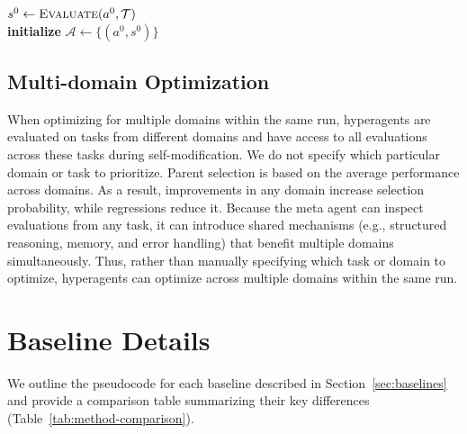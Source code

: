 \begin{algorithm}[H]
\DontPrintSemicolon
\SetAlgoLined
{}
\BlankLine
$s^{0} \leftarrow \textsc{Evaluate}(a^{0}, \mathcal{T})$ \\
\textbf{initialize} $\mathcal{A} \leftarrow \{(a^{0}, s^{0})\}$ 
\caption{Darwin G\"odel Machine with Hyperagents (DGM-H)}
\label{algo:DGM-H}
\end{algorithm}

\subsection{Multi-domain Optimization}
\label{app:multi-domain}

When optimizing for multiple domains within the same run, hyperagents are evaluated on tasks from different domains and have access to all evaluations across these tasks during self-modification. We do not specify which particular domain or task to prioritize. Parent selection is based on the average performance across domains. As a result, improvements in any domain increase selection probability, while regressions reduce it. Because the meta agent can inspect evaluations from any task, it can introduce shared mechanisms (e.g., structured reasoning, memory, and error handling) that benefit multiple domains simultaneously. Thus, rather than manually specifying which task or domain to optimize, hyperagents can optimize across multiple domains within the same run.

\section{Baseline Details}
\label{app:baseline-details}

We outline the pseudocode for each baseline described in Section~\ref{sec:baselines} and provide a comparison table summarizing their key differences (Table~\ref{tab:method-comparison}).

